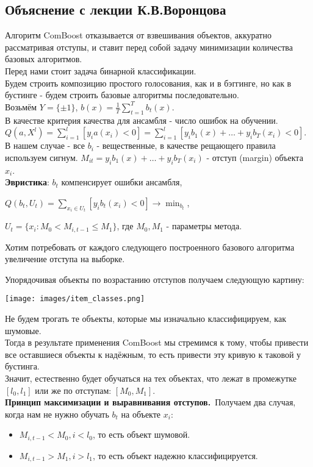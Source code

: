 \subsection{Объяснение с лекции К.В.Воронцова}
Алгоритм ComBoost отказывается от взвешивания объектов, аккуратно рассматривая отступы, и ставит перед собой задачу минимизации количества базовых алгоритмов. \\
Перед нами стоит задача бинарной классификации. \\
Будем строить композицию простого голосования, как и в бэггинге, но как в бустинге - будем строить базовые алгоритмы последовательно. \\
Возьмём $Y = \{\pm1\}$, $b(x) = \frac{1}{T}\sum_{t=1}^{T}b_t(x)$.\\
В качестве критерия качества для ансамбля - число ошибок на обучении.\\
$Q(a,X^l) = \sum_{i=1}^{l}[y_ia(x_i) < 0] = \sum_{i=1}^{l}[y_ib_1(x) + \dots + y_ib_T(x_i) < 0]$. \\
В нашем случае - все $b_i$ - вещественные, в качестве рещающего правила используем сигнум.
$M_{it} = y_ib_1(x) + \dots + y_ib_T(x_i)$ - отступ (margin) объекта $x_i$. \\
\textbf{Эвристика}: $b_t$ компенсирует ошибки ансамбля, \\
\begin{center}
     $Q(b_t, U_t) = \sum_{x_i \in U_t}[y_ib_t(x_i) < 0] \rightarrow \min_{b_t}$,
\end{center}
$U_t = \{x_i : M_0 < M_{i,t-1} \leq M_1\}$, где $M_0, M_1$ - параметры метода. 
    
Хотим потребовать от каждого следующего построенного базового алгоритма увеличение отступа на выборке. 
    
Упорядочивая объекты по возрастанию отступов получаем следующую картину:
    
\texttt{[image: images/item\_classes.png]}

Не будем трогать те объекты, которые мы изначально классифицируем, как шумовые. \\
Тогда в результате применения ComBoost мы стремимся к тому, чтобы привести все оставшиеся объекты к надёжным, то есть привести эту кривую к таковой у бустинга. \\
Значит, естественно будет обучаться на тех объектах, что лежат в промежутке $[l_0, l_1]$ или же по отступам: $[M_0, M_1]$. \\
    
\textbf{Принцип максимизации и выравнивания отступов.}\
Получаем два случая, когда нам не нужно обучать $b_t$ на объекте $x_i$: \\
\begin{itemize}
    \item $M_{i,t-1} < M_0, i<l_0$, то есть объект шумовой.
    \item $M_{i,t-1} > M_1, i>l_1$, то есть объект надежно классифицируется.
\end{itemize}
    
